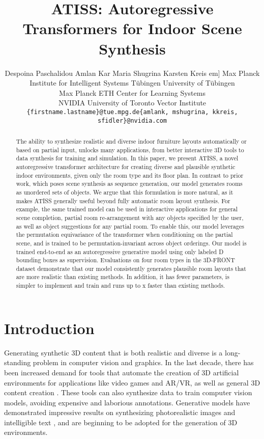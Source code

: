 \documentclass{article}
\title{ATISS: Autoregressive Transformers for Indoor Scene Synthesis}
\author{Despoina Paschalidou \quad Amlan Kar \quad Maria Shugrina \quad Karsten Kreis \1em]
  Max Planck Institute for Intelligent Systems T{\"u}bingen\quad
  University of T{\"u}bingen\\
  Max Planck ETH Center for Learning Systems\\
  NVIDIA\quad
  University of Toronto\quad
  Vector Institute \\
  {\tt\small \{firstname.lastname\}@tue.mpg.de\quad \{amlank, mshugrina, kkreis, sfidler\}@nvidia.com}
                                            }
\begin{document}
\maketitle

\begin{abstract}
The ability to synthesize realistic and diverse indoor furniture layouts
automatically or based on partial input, unlocks many applications, from better
interactive 3D tools to data synthesis for training and simulation. In this
paper, we present ATISS, a novel autoregressive transformer architecture for
creating diverse and plausible synthetic indoor environments, given only the
room type and its floor plan. In contrast to prior work, which poses scene
synthesis as sequence generation, our model generates rooms as unordered sets
of objects. We argue that this formulation is more natural, as it makes ATISS
generally useful beyond fully automatic room layout synthesis. For example, the
same trained model can be used in interactive applications for general scene
completion, partial room re-arrangement with any objects specified by the user,
as well as object suggestions for any partial room. To enable this, our model
leverages the permutation equivariance of the transformer when conditioning on
the partial scene, and is trained to be permutation-invariant across object
orderings. Our model is trained end-to-end as an autoregressive generative
model using only labeled D bounding boxes as supervision. Evaluations on
four room types in the 3D-FRONT dataset demonstrate that our model consistently
generates plausible room layouts that are more realistic than existing methods.
In addition, it has fewer parameters, is simpler to implement and train and
runs up to x faster than existing methods.

\end{abstract}

\vspace{-4mm}
\section{Introduction}
\label{sec:intro}
\vspace{-1mm}

Generating synthetic 3D content that is both realistic and diverse is a
long-standing problem in computer vision and graphics.  In the last decade,
there has been increased demand for tools that automate the creation of 3D
artificial environments for applications like video games and AR/VR, as well as
general 3D content creation \cite{Yu2011SIGGRAPH, Fisher2011SIGGRAPH,
Merrell2011SIGGRAPH, Chaudhuri2013UIST, Yu20216VisComputGraph}. These tools can
also synthesize data to train computer vision models, avoiding expensive and
laborious annotations. Generative models \cite{Kingma2014ICLR,
Goodfellow2014NIPS, Dinh2017ICLR, Kingma2018NIPS, Vaswani2017NIPS} have
demonstrated impressive results on synthesizing photorealistic images
\cite{Choi2018CVPR, Brock2019ICLR, Karras2019CVPR, Choi2020CVPR,
Karras2020CVPR} and intelligible text \cite{Radford2019ARXIV,
Brown2020NeurIPS}, and are beginning to be adopted for the generation of 3D
environments. 
\end{document}
